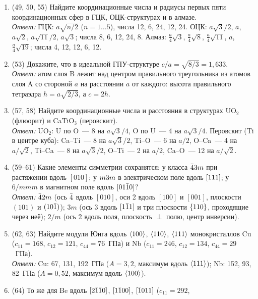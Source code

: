 \begin{enumerate}[label={\sffamily\bfseries\color{fmHead}\arabic*.}]
Браве?\\
\emph{Ответ:} центрирование одной пары граней несовместимо с осями 3
вдоль $\nfam{111}$, которые переводят грани $(001)$ в $(100)$ и $(010)$;
такая решётка имела бы лишь тетрагональную симметрию.
\item (49, 50, 55) Найдите координационные числа и радиусы первых пяти
координационных сфер в ГЦК, ОЦК-структурах и в алмазе.\\
\emph{Ответ:} ГЦК: $a\sqrt{n/2}$ ($n=1\ldots5$), числа 12, 6, 24, 12, 24.
ОЦК: $a\sqrt3/2$, $a$, $a\sqrt2$, $a\sqrt{11}/2$, $a\sqrt3$; числа 8, 6, 12,
24, 8. Алмаз: $\frac a4\sqrt3$, $\frac a4\sqrt8$, $\frac a4\sqrt{11}$, $a$,
$\frac a4\sqrt{19}$; числа 4, 12, 12, 6, 12.
\item (53) Докажите, что в идеальной ГПУ-структуре $c/a=\sqrt{8/3}=1{,}633$.\\
\emph{Ответ:} атом слоя B лежит над центром правильного треугольника из
атомов слоя A со стороной $a$ на расстоянии $a$ от каждого: высота
правильного тетраэдра $h=a\sqrt{2/3}$, а $c=2h$.
\item (57, 58) Найдите координационные числа и расстояния в структурах
UO$_2$ (флюорит) и CaTiO$_3$ (перовскит).\\
\emph{Ответ:} UO$_2$: U по O~— 8 на $a\sqrt3/4$, O по U~— 4 на
$a\sqrt3/4$. Перовскит (Ti в центре куба): Ca--Ti~— 8 на $a\sqrt3/2$,
Ti--O~— 6 на $a/2$, O--Ca~— 4 на $a/\sqrt2$, Ti--Ca~— 8 на $a\sqrt3/2$,
O--Ti~— 2 на $a/2$, Ca--O~— 12 на $a/\sqrt2$.
\item (59--61) Какие элементы симметрии сохранятся: у класса $\bar{4}3m$ при
растяжении вдоль $[010]$; у $m\bar{3}m$ в электрическом поле вдоль $[1\bar{1}1]$; у
$6/mmm$ в магнитном поле вдоль $[01\bar{1}0]$?\\
\emph{Ответ:} $\bar{4}2m$ (ось $\bar{4}$ вдоль $[010]$, оси 2 вдоль $[100]$ и
$[001]$, плоскости $(101)$ и $(10\bar{1})$); $3m$ (ось 3 вдоль $[1\bar{1}1]$ и
три плоскости $\{110\}$, проходящие через неё); $2/m$ (ось 2 вдоль
поля, плоскость $\perp$ полю, центр инверсии).
\item (62, 63) Найдите модули Юнга вдоль $\langle 100\rangle$, $\langle 110\rangle$,
$\nfam{111}$ монокристаллов Cu ($c_{11}=168$, $c_{12}=121$, $c_{44}=76$~ГПа)
и Nb ($c_{11}=246$, $c_{12}=134$, $c_{44}=29$~ГПа).\\
\emph{Ответ:} Cu: 67, 131, 192~ГПа ($A=3{,}2$, максимум вдоль $\nfam{111}$);
Nb: 152, 93, 82~ГПа ($A=0{,}52$, максимум вдоль $\langle 100\rangle$).
\item (64) То же для Be вдоль $[2\bar{1}\bar{1}0]$, $[1\bar{1}00]$, $[\bar{1}011]$ ($c_{11}=292$,

\end{enumerate}
